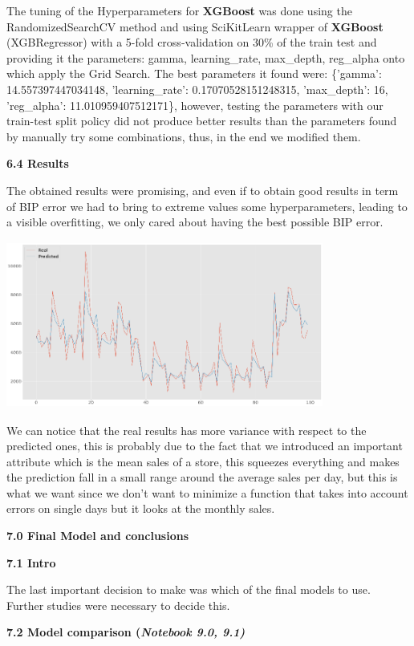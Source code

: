\documentclass[]{article}
\begin{document}
The tuning of the Hyperparameters for \textbf{XGBoost} was done using
the RandomizedSearchCV method and using SciKitLearn wrapper of
\textbf{XGBoost} (XGBRegressor) with a 5-fold cross-validation on 30\%
of the train test and providing it the parameters: gamma,
learning\_rate, max\_depth, reg\_alpha onto which apply the Grid Search.
The best parameters it found were: \{'gamma': 14.557397447034148,
'learning\_rate': 0.17070528151248315, 'max\_depth': 16, 'reg\_alpha':
11.010959407512171\}, however, testing the parameters with our
train-test split policy did not produce better results than the
parameters found by manually try some combinations, thus, in the end we
modified them.

\textbf{6.4 Results }

The obtained results were promising, and even if to obtain good results
in term of BIP error we had to bring to extreme values some
hyperparameters, leading to a visible overfitting, we only cared about
having the best possible BIP
error.

\includegraphics[width=4.10208in,height=2.15833in]{media/image11.png}

We can notice that the real results has more variance with respect to
the predicted ones, this is probably due to the fact that we introduced
an important attribute which is the mean sales of a store, this squeezes
everything and makes the prediction fall in a small range around the
average sales per day, but this is what we want since we don't want to
minimize a function that takes into account errors on single days but it
looks at the monthly sales.

\textbf{7.0 Final Model and conclusions}

\textbf{7.1 Intro}

The last important decision to make was which of the final models to
use. Further studies were necessary to decide this.

\textbf{7.2 Model comparison (\emph{Notebook 9.0, 9.1)}}
\end{document}
